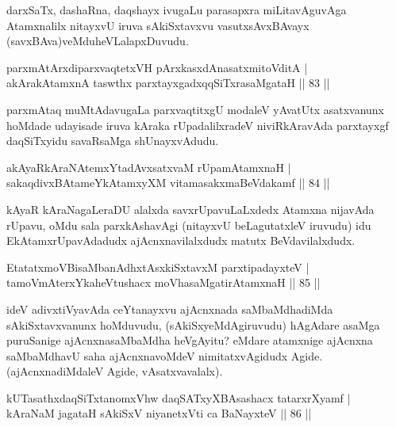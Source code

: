 \begin{artha}
darxSaTx, dashaRna, daqshayx ivugaLu parasapxra miLitavAguvAga Atamxnalilx nitayxvU iruva sAkiSxtavxvu vasutxsAvxBAvayx (savxBAva)veMdu\break heVLalapxDuvudu.
\end{artha}

\begin{shl}
parxmAtArxdiparxvaqtetxVH pArxkasxdAnasatxmitoVditA |\\
akArakAtamxnA taswthx parxtayxgadxqqSiTxrasaMgataH \hfill || 83 ||
\end{shl}

\begin{artha}
parxmAtaq muMtAdavugaLa parxvaqtitxgU modaleV yAvatUtx asatxvanunx hoMdade udayisade iruva kAraka rUpadalilxradeV niviRkAravAda parxtayxgf daqSiTxyidu savaRsaMga shUnayxvAdudu.
\end{artha}

\begin{shl}
akAyaRkAraNAtemxYtadAvxsatxvaM rUpamAtamxnaH |\\
sakaqdivxBAtameYkAtamxyXM vitamasakxmaBeVdakamf \hfill || 84 ||
\end{shl}

\begin{artha}
kAyaR kAraNagaLeraDU alalxda savxrUpavuLaLxdedx Atamxna nijavAda rUpavu, oMdu sala parxkAshavAgi (nitayxvU beLagutatxleV iruvudu) idu EkAtamxrUpavAdadudx ajAcnxnavilalxdudx matutx BeVdavilalxdudx.
\end{artha}


\begin{shl}
EtatatxmoVBisaMbanAdhxtAsxkiSxtavxM parxtipadayxteV |\\
tamoVmAterxYkaheVtushacx moVhasaMgatirAtamxnaH \hfill || 85 ||
\end{shl}

\begin{artha}
ideV adivxtiVyavAda ceYtanayxvu ajAcnxnada saMbaMdhadiMda sAkiSxtavxvanunx hoMduvudu, (sAkiSxyeMdAgiruvudu) hAgAdare asaMga puruSanige ajAcnxnasaMbaMdha heVgAyitu? eMdare atamxnige ajAcnxna saMbaMdhavU saha ajAcnxnavoMdeV nimitatxvAgidudx Agide. (ajAcnxnadiMdaleV Agide, vAsatxvavalalx).
\end{artha}


\begin{shl}
kUTasathxdaqSiTxtanomxVhw daqSATxyXBAsashacx tatarxrXyamf |\\
kAraNaM jagataH sAkiSxV niyanetxVti ca BaNayxteV \hfill || 86 ||
\end{shl}


